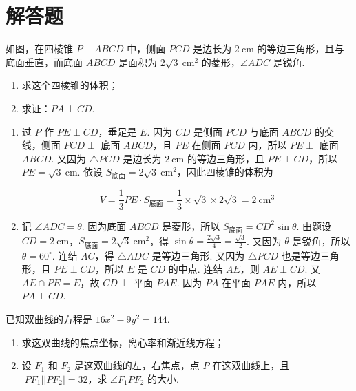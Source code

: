 \documentclass[UTF8,a4paper,oneside,11pt]{ctexbook}
\begin{document}
\section{解答题}

\begin{problem}
如图，在四棱锥 \(P-ABCD\) 中，侧面 \(PCD\) 是边长为 \(2\mathrm{~cm}\) 的等边三角形，且与底面垂直，而底面 \(ABCD\) 是面积为 \(2\sqrt{3}\mathrm{~cm}^2\) 的菱形，\(\angle ADC\) 是锐角.
\begin{enumerate}
\item 求这个四棱锥的体积；
\item 求证：\(PA \perp CD\).
\end{enumerate}

\end{problem}

\begin{solution}
\begin{enumerate}
\item 过 \(P\) 作 \(PE \perp CD\)，垂足是 \(E\). 因为 \(CD\) 是侧面 \(PCD\) 与底面 \(ABCD\) 的交线，侧面 \(PCD \perp\) 底面 \(ABCD\)，且 \(PE\) 在侧面 \(PCD\) 内，所以 \(PE \perp\) 底面 \(ABCD\). 又因为 \(\triangle PCD\) 是边长为 \(2\mathrm{~cm}\) 的等边三角形，且 \(PE \perp CD\)，所以 \(PE=\sqrt{3}\mathrm{~cm}\). 依设 \(S_{\text{底面}}=2\sqrt{3}\mathrm{~cm}^2\)，因此四棱锥的体积为

\[
V=\frac{1}{3}PE\cdot S_{\text{底面}}=\frac{1}{3}\times\sqrt{3}\times2\sqrt{3}=2\mathrm{~cm}^3
\]

\item 记 \(\angle ADC=\theta\). 因为底面 \(ABCD\) 是菱形，所以 \(S_{\text{底面}}=CD^2\sin\theta\). 由题设 \(CD=2\mathrm{~cm}\)，\(S_{\text{底面}}=2\sqrt{3}\mathrm{~cm}^2\)，得 \(\sin\theta=\frac{2\sqrt{3}}{4}=\frac{\sqrt{3}}{2}\). 又因为 \(\theta\) 是锐角，所以 \(\theta=60^{\circ}\). 连结 \(AC\)，得 \(\triangle ADC\) 是等边三角形. 又因为 \(\triangle PCD\) 也是等边三角形，且 \(PE\perp CD\)，所以 \(E\) 是 \(CD\) 的中点. 连结 \(AE\)，则 \(AE\perp CD\). 又 \(AE\cap PE=E\)，故 \(CD\perp\) 平面 \(PAE\). 因为 \(PA\) 在平面 \(PAE\) 内，所以 \(PA\perp CD\).
\end{enumerate}
\end{solution}

\begin{problem}
已知双曲线的方程是 \(16x^2 - 9y^2 = 144\).
\begin{enumerate}
\item 求这双曲线的焦点坐标，离心率和渐近线方程；
\item 设 \(F_1\) 和 \(F_2\) 是这双曲线的左，右焦点，点 \(P\) 在这双曲线上，且 \(\left|PF_1\right|\left|PF_2\right| = 32\)，求 \(\angle F_1PF_2\) 的大小.
\end{enumerate}
\end{problem}
\end{document}

